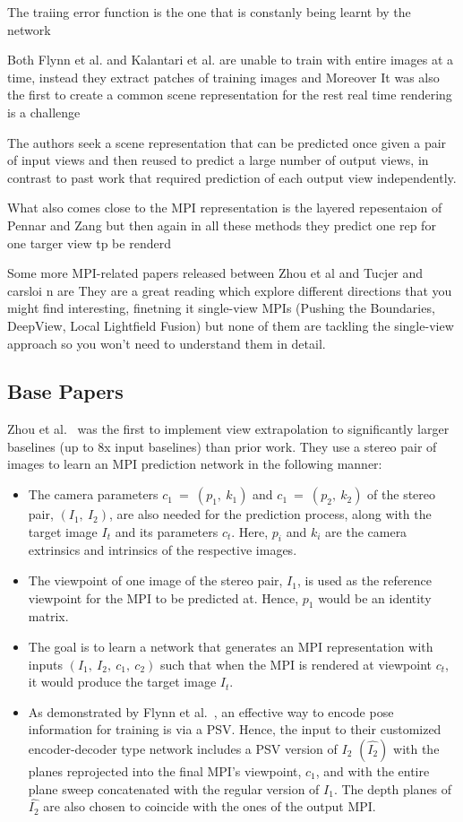 The traiing error function is the one that is constanly being learnt by the network

Both Flynn et al. and Kalantari et al. are unable to train with entire images at a time, instead they extract patches of training images and
Moreover It was also the first to create a common scene representation  
for the rest real time rendering is a challenge

 The authors seek a scene representation that can be predicted once given a pair of input views and then reused to predict a large number of output views, in contrast to past work that required prediction of each output view independently.

What also comes close to the MPI representation is the layered repesentaion of Pennar and Zang but then again in all these methods they predict one rep for one targer view tp be renderd 

Some more MPI-related papers released between Zhou et al and Tucjer and carsloi n are 
They are a great reading which explore different directions that you might find interesting, finetning it single-view MPIs 
(Pushing the Boundaries, DeepView, Local Lightfield Fusion)  but none of them are tackling the single-view approach so you won't need to understand them in detail.


\subsection{Base Papers}\label{subsec:base-papers}

Zhou et al.~\cite{zhou2018stereo} was the first to implement view extrapolation to significantly larger baselines (up to 8x input baselines) than prior work. They use a stereo pair of images to learn an MPI prediction network in the following manner:

\begin{itemize}
    \item The camera parameters $c_1\ =\ (p_1,\ k_1)$ and $c_1\ =\ (p_2,\ k_2)$ of the stereo pair, $(I_1,\ I_2)$, are also needed for the prediction process, along with the target image $I_t$ and its parameters $c_t$. Here, $p_i$ and $k_i$ are the camera extrinsics and intrinsics of the respective images.
    \item The viewpoint of one image of the stereo pair, $I_1$, is used as the reference viewpoint for the MPI to be predicted at. Hence, $p_1$ would be an identity matrix.
    \item The goal is to learn a network that generates an MPI representation with inputs $(I_1,\ I_2,\ c_1,\ c_2)$ such that when the MPI is rendered at viewpoint $c_t$, it would produce the target image $I_t$. 
    \item As demonstrated by Flynn et al.~\cite{deep_stereo_2016}, an effective way to encode pose information for training is via a PSV. Hence, the input to their customized encoder-decoder type network includes a PSV version of $I_2$ $(\hat{I_2})$ with the planes reprojected into the final MPI's viewpoint, $c_1$, and with the entire plane sweep concatenated with the regular version of $I_1$. The depth planes of $\hat{I_2}$ are also chosen to coincide with the ones of the output MPI.
\end{itemize}

